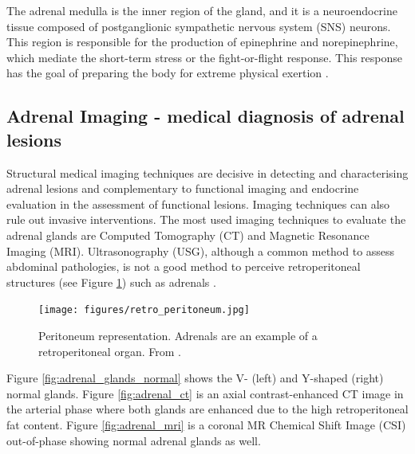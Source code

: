 \documentclass[11pt]{article}
\begin{document}
The adrenal medulla is the inner region of the gland, and it is a neuroendocrine
tissue composed of postganglionic sympathetic nervous system (SNS) neurons. This
region is responsible for the production of epinephrine and norepinephrine,
which mediate the short-term stress or the fight-or-flight response. This
response has the goal of preparing the body for extreme physical exertion
\cite{open}.

\subsection{Adrenal Imaging - medical diagnosis of adrenal lesions}

Structural medical imaging techniques are decisive in detecting and
characterising adrenal lesions and complementary to functional imaging and
endocrine evaluation in the assessment of functional lesions. Imaging techniques
can also rule out invasive interventions. The most used imaging techniques to
evaluate the adrenal glands are Computed Tomography (CT) and Magnetic Resonance
Imaging (MRI). Ultrasonography (USG), although a common method to assess
abdominal pathologies, is not a good method to perceive retroperitoneal
structures (see Figure \ref{fig:retro_per}) such as adrenals \cite{Panda2015}.

\begin{figure}
    \centering
    \texttt{[image: figures/retro\_peritoneum.jpg]}
    \caption{Peritoneum representation. Adrenals are an example of a retroperitoneal organ. From \cite{retroimg}.}
    \label{fig:retro_per}
\end{figure}

Figure \ref{fig:adrenal_glands_normal} shows the V- (left) and Y-shaped (right)
normal glands. Figure \ref{fig:adrenal_ct} is an axial contrast-enhanced CT
image in the arterial phase where both glands are enhanced due to the high
retroperitoneal fat content. Figure \ref{fig:adrenal_mri} is a coronal MR
Chemical Shift Image (CSI) out-of-phase showing normal adrenal glands as well.
\end{document}
